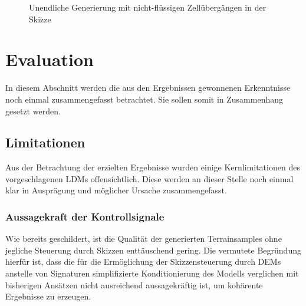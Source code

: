 \begin{figure}[htbp]
    \centering

    \vspace{-8pt}

    \caption{Unendliche Generierung mit nicht-flüssigen Zellübergängen in der Skizze}
    \label{fig:disconnected}
\end{figure}


\section{Evaluation}

In diesem Abschnitt werden die aus den Ergebnissen gewonnenen Erkenntnisse noch einmal zusammengefasst betrachtet. Sie sollen somit in Zusammenhang gesetzt werden.

\subsection{Limitationen}

Aus der Betrachtung der erzielten Ergebnisse wurden einige Kernlimitationen des vorgeschlagenen \ac{LDM}s offensichtlich. Diese werden an dieser Stelle noch einmal klar in Ausprägung und möglicher Ursache zusammengefasst.

\subsubsection{Aussagekraft der Kontrollsignale}

Wie bereits geschildert, ist die Qualität der generierten Terrainsamples ohne jegliche Steuerung durch Skizzen enttäuschend gering. Die vermutete Begründung hierfür ist, dass die für die Ermöglichung der Skizzensteuerung durch \ac{DEM}s anstelle von Signaturen simplifizierte Konditionierung des Modells verglichen mit bisherigen Ansätzen nicht ausreichend aussagekräftig ist, um kohärente Ergebnisse zu erzeugen. 

